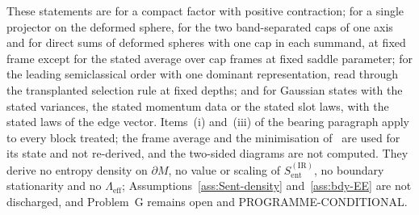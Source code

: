 These statements are for a compact factor with positive contraction; for a single projector on the deformed sphere, for the two band-separated caps of one axis and for direct sums of deformed spheres with one cap in each summand, at fixed frame except for the stated average over cap frames at fixed saddle parameter; for the leading semiclassical order with one dominant representation, read through the transplanted selection rule at fixed depths; and for Gaussian states with the stated variances, the stated momentum data or the stated slot laws, with the stated laws of the edge vector. Items~(i) and~(iii) of the bearing paragraph apply to every block treated; the frame average and the minimisation of~\cite{FlissFrenkelHartnollSoni2025} are used for its state and not re-derived, and the two-sided diagrams are not computed. They derive no entropy density on \(\partial M\), no value or scaling of \(S_{\mathrm{ent}}^{\mathrm{(IR)}}\), no boundary stationarity and no \(\Lambda_{\mathrm{eff}}\); Assumptions~\ref{ass:Sent-density} and~\ref{ass:bdy-EE} are not discharged, and Problem~G remains open and PROGRAMME-CONDITIONAL.
